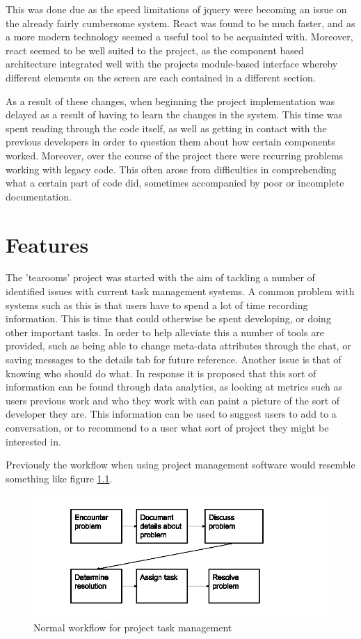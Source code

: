 \documentclass{l4proj}
\begin{document}
This was done due as the speed limitations of jquery were becoming an issue on the already fairly cumbersome system.  React was found to be much faster, and as a more modern technology seemed a useful tool to be acquainted with.  Moreover, react seemed to be well suited to the project, as the component based architecture integrated well with the projects module-based interface whereby different elements on the screen are each contained in a different section.

As a result of these changes, when beginning the project implementation was delayed as a result of having to learn the changes in the system.  This time was spent reading through the code itself, as well as getting in contact with the previous developers in order to question them about how certain components worked.  Moreover, over the course of the project there were recurring problems working with legacy code.  This often arose from difficulties in comprehending what a certain part of code did, sometimes accompanied by poor or incomplete documentation.

\chapter{Features}

The 'tearooms' project was started with the aim of tackling a number of identified issues with current task management systems. A common problem with systems such as this is that users have to spend a lot of time recording information.  This is time that could otherwise be spent developing, or doing other important tasks.  In order to help alleviate this a number of tools are provided, such as being able to change meta-data attributes through the chat, or saving messages to the details tab for future reference.   Another issue is that of knowing who should do what.  In response it is proposed that this sort of information can be found through data analytics, as looking at metrics such as users previous work and who they work with can paint a picture of the sort of developer they are.  This information can be used to suggest users to add to a conversation, or to recommend to a user what sort of project they might be interested in.

Previously the workflow when using project management software would resemble something like figure \ref{fig:1}.  


\begin{figure}[h]
\includegraphics[scale=0.75]{old-workflow.png}
\centering
\caption{Normal workflow for project task management}
\label{fig:1}
\end{figure}
\newpage
\end{document}
